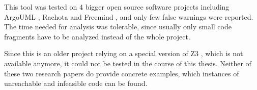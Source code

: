 This tool was tested on 4 bigger open source software projects including ArgoUML \cite{ArgoUMLResourcesSite}, Rachota \cite{RachotaTimetracker} and Freemind \cite{MainPageFreeMind}, and only few false warnings were reported.
The time needed for analysis was tolerable, since usually only small code fragments have to be analyzed instead of the whole project.

Since this is an older project relying on a special version of Z3 \cite{demouraZ3EfficientSMT2008}, which is not available anymore, it could not be tested in the course of this thesis. Neither of these two research papers \cite{arltJoogieInfeasibleCode2012, arltJoogieJavaJimple2013} do provide concrete examples, which instances of unreachable and infeasible code can be found.


